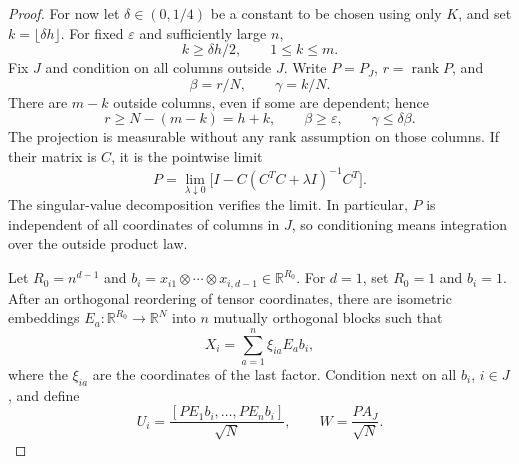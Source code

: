 \documentclass[11pt]{article}
\newcommand{\R}{\mathbb R}
\newcommand{\rank}{\operatorname{rank}}
\begin{document}
\begin{proof}
For now let \(\delta\in(0,1/4)\) be a constant to be chosen using
only \(K\), and set \(k=\lfloor\delta h\rfloor\).
For fixed \(\varepsilon\) and sufficiently large \(n\),
\[
 k\ge\delta h/2,\qquad 1\le k\le m.
\]
Fix \(J\) and condition on all columns outside \(J\).
Write \(P=P_J\), \(r=\rank P\), and
\[
 \beta=r/N,\qquad\gamma=k/N.
\]
There are \(m-k\) outside columns, even if some are dependent; hence
\begin{equation}\label{eq:rank}
 r\ge N-(m-k)=h+k,\qquad
 \beta\ge\varepsilon,\qquad\gamma\le\delta\beta.
\end{equation}
The projection is measurable without any rank assumption on those
columns. If their matrix is \(C\), it is the pointwise limit
\[
 P=\lim_{\lambda\downarrow0}
 \big[I-C(C^TC+\lambda I)^{-1}C^T\big].
\]
The singular-value decomposition verifies the limit. In particular,
\(P\) is independent of all coordinates of columns in \(J\), so
conditioning means integration over the outside product law.

Let \(R_0=n^{d-1}\) and
\(b_i=x_{i1}\otimes\cdots\otimes x_{i,d-1}\in\R^{R_0}\).
For \(d=1\), set \(R_0=1\) and \(b_i=1\).
After an orthogonal reordering of tensor coordinates, there are
isometric embeddings \(E_a:\R^{R_0}\to\R^N\) into \(n\)
mutually orthogonal blocks such that
\[
 X_i=\sum_{a=1}^n \xi_{ia}E_ab_i,
\]
where the \(\xi_{ia}\) are the coordinates of the last factor.
Condition next on all \(b_i\), \(i\in J\), and define
\begin{equation}\label{eq:Ui}
 U_i=\frac{[PE_1b_i,\ldots,PE_nb_i]}{\sqrt N},
 \qquad W=\frac{PA_J}{\sqrt N}.
\end{equation}


\end{proof}
\end{document}
